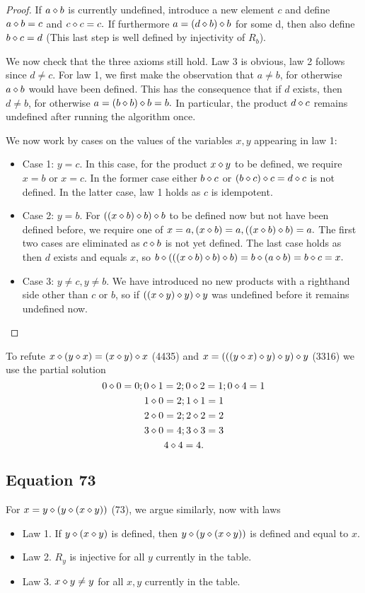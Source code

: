 \begin{proof}
If $a \diamond b$ is currently undefined, introduce a new element $c$ and define $a \diamond b = c$ and $ c \diamond c = c.$ If furthermore $a = (d \diamond b) \diamond b$ for some d, then also define $b \diamond c = d$ (This last step is well defined by injectivity of $R_b$).

We now check that the three axioms still hold. Law 3 is obvious, law 2 follows since $d \not = c$. For law 1, we first make the observation that $a \not = b$, for otherwise $a \diamond b$ would have been defined. This has the consequence that if $d$ exists, then $d \not = b$, for otherwise $a = (b \diamond b) \diamond b = b.$ In particular, the product $d \diamond c$ remains undefined after running the algorithm once.

We now work by cases on the values of the variables $x,y$ appearing in law 1:
\begin{itemize}
\item Case 1: $y=c$. In this case, for the product $x \diamond y$ to be defined, we require $x =b$ or $x = c$. In the former case either $b \diamond c$ or $(b \diamond c) \diamond c = d \diamond c$ is not defined. In the latter case, law 1 holds as $c$ is idempotent.
\item Case 2: $y=b$. For $((x \diamond b) \diamond b) \diamond b$ to be defined now but not have been defined before, we require one of $x= a, (x \diamond b) = a, ((x \diamond b) \diamond b) = a.$ The first two cases are eliminated as $c \diamond b$ is not yet defined. The last case holds as then $d$ exists and equals $x$, so $b \diamond (((x \diamond b) \diamond b) \diamond b) = b \diamond (a \diamond b) = b \diamond c = x.$
\item Case 3: $y \not = c, y \not = b$. We have introduced no new products with a righthand side other than $c$ or $b$, so if $((x \diamond y) \diamond y) \diamond y$ was undefined before it remains undefined now.
\end{itemize}
\end{proof}

To refute $x \diamond (y \diamond x) = (x \diamond y) \diamond x$ (4435) and $x = (((y \diamond x) \diamond y) \diamond y) \diamond y$ (3316) we use the partial solution
$$ 0 \diamond 0 = 0; 0 \diamond 1 = 2; 0 \diamond 2 = 1; 0 \diamond 4 = 1$$
$$ 1 \diamond 0 = 2; 1 \diamond 1 = 1$$
$$ 2 \diamond 0 = 2; 2 \diamond 2 = 2$$
$$ 3 \diamond 0 = 4; 3 \diamond 3 = 3$$
$$ 4 \diamond 4 = 4.$$

\subsection{Equation 73}

For $x = y \diamond (y \diamond (x \diamond y))$ (73), we argue similarly, now with laws
\begin{itemize}
\item Law 1.  If $y \diamond (x \diamond y)$ is defined, then $y \diamond (y \diamond (x \diamond y))$ is defined and equal to $x$.
\item Law 2.  $R_y$ is injective for all $y$ currently in the table.
\item Law 3.  $x \diamond y \neq y$ for all $x,y$ currently in the table.
\end{itemize}

